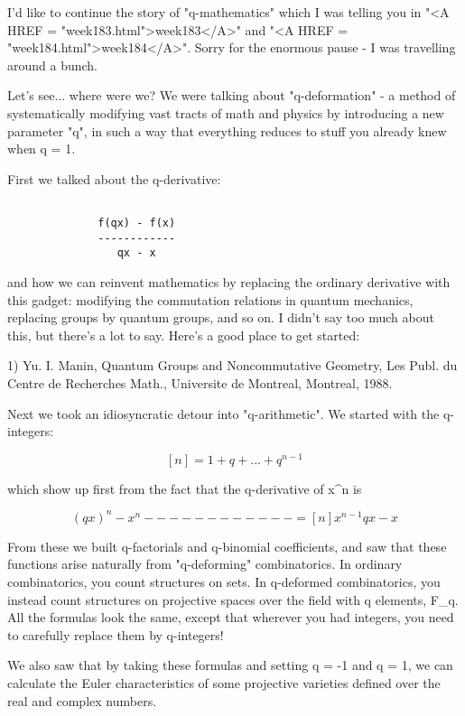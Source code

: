 




I'd like to continue the story of "q-mathematics" which I was
telling you in "<A HREF = "week183.html">week183</A>" and
"<A HREF = "week184.html">week184</A>".  Sorry for the
enormous pause - I was travelling around a bunch.

Let's see... where were we?  We were talking about "q-deformation" - 
a method of systematically modifying vast tracts of math and physics by
introducing a new parameter "q", in such a way that everything reduces
to stuff you already knew when q = 1.

First we talked about the q-derivative:


\begin{verbatim}

              f(qx) - f(x)
              ------------
                 qx - x
\end{verbatim}
    
and how we can reinvent mathematics by replacing the ordinary
derivative with this gadget: modifying the commutation relations in
quantum mechanics, replacing groups by quantum groups, and so on.  
I didn't say too much about this, but there's a lot to say.  Here's a
good place to get started:

1) Yu. I. Manin, Quantum Groups and Noncommutative Geometry, Les
Publ. du Centre de Recherches Math., Universite de Montreal, Montreal,
1988.

Next we took an idiosyncratic detour into "q-arithmetic".  We
started with the q-integers:


$$

[n] = 1 + q + ... + q^{n-1}
$$
    
which show up first from the fact that the q-derivative of x^{n} is 


$$

               (qx)^{n} - x^{n}
              ------------ = [n] x^{n-1}
                 qx - x
$$
    
From these we built q-factorials and q-binomial coefficients, and saw
that these functions arise naturally from "q-deforming"
combinatorics.  In ordinary combinatorics, you count structures on sets.
In q-deformed combinatorics, you instead count structures on projective
spaces over the field with q elements, F_{q}.  All the formulas look the
same, except that wherever you had integers, you need to carefully
replace them by q-integers!

We also saw that by taking these formulas and setting q = -1 and q = 1, 
we can calculate the Euler characteristics of some projective varieties 
defined over the real and complex numbers.  

